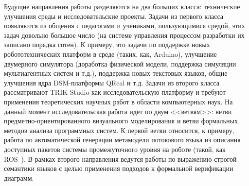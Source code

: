 \documentclass[conference]{IEEEtran}
\begin{document}
Будущие направления работы разделяются на два больших класса: технические улучшения среды и исследовательские проекты. Задачи из первого класса появляются из общения с педагогами и учениками, пользующимися средой, этих задач довольно большое число (на системе управления процессом разработки их записано порядка сотен). К примеру, это задачи по поддержке новых робототехнических платформ в среде (таких, как, Arduino), улучшение двумерного симулятора (доработка физической модели, поддержка симуляции мультиагентных систем и т.д.), поддержка новых текстовых языков, общие улучшения ядра DSM-платформы QReal и т.д. Задачи из второго класса рассматривают TRIK Studio как исследовательскую платформу и требуют применения теоретических научных работ в области компьютерных наук. На данный момент исследовательская работа идет по двум <<ветвям>>: ветви предметно-ориентированного визуального моделирования и ветви формальных методов анализа программных систем. К первой ветви относится, к примеру, работа по автоматической генерации метамодели потокового языка из описания доступных пакетов системы промежуточного уровня на роботе (такой, как ROS~\cite{quigley2009ros}). В рамках второго направления ведутся работы по выражению строгой семантики языков с целью применения подходов к формальной верификации диаграмм.



\end{document}
